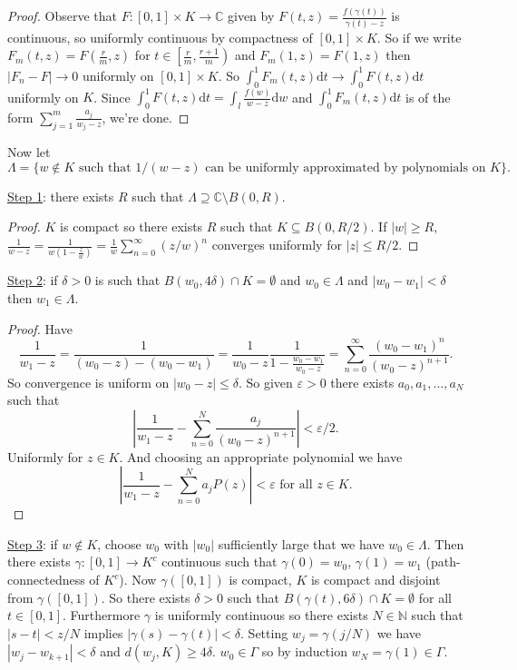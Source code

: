 \documentclass[a4paper, 10pt, twocolumn]{amsart}
\theoremstyle{definition}
\newcommand{\bb}[1]{\mathbb{#1}}
\newcommand{\eps}[0]{\varepsilon}
\newcommand{\sbs}[0]{\subseteq}
\newcommand{\1}{\mathbbm{1}}
\begin{document}
\begin{proof}
    Observe that $F: [0,1]\times K \to \bb{C}$ given by $F(t,z) =\frac{f(\gamma(t))}{\gamma(t)-z}$ is continuous, so uniformly continuous by compactness of $[0,1]\times K$. So if we write $F_m(t,z) = F\left(\frac{r}{m},z\right)$ for $t \in \left[\frac{r}{m},\frac{r+1}{m}\right)$ and $F_m(1,z) = F(1,z)$ then $|F_n-F| \to 0$ uniformly on $[0,1] \times K$. So $\int_0^1 F_m(t,z) \mathrm{d}t \to \int_0^1 F(t,z) \mathrm{d}t$ uniformly on $K$. Since $\int_0^1 F(t,z) \mathrm{d}t = \int_{l} \frac{f(w)}{w-z}\mathrm{d}w$ and $\int_0^1 F_m(t,z)\mathrm{d}t$ is of the form $\sum_{j=1}^m \frac{a_j}{w_j-z}$, we're done.
\end{proof}




Now let \[\Lambda = \{w\not \in K \text{ such that } 1/(w-z) \text{ can be uniformly approximated by polynomials on }K\}.\]

\underline{Step 1}: there exists $R$ such that $\Lambda \supseteq \bb{C}\setminus B(0,R)$. 

\begin{proof}
    $K$ is compact so there exists $R$ such that $K \sbs B(0,R/2)$. If $|w|\ge R$, $\frac{1}{w-z} = \frac{1}{w(1-\frac{z}{w})} = \frac{1}{w} \sum_{n=0}^\infty (z/w)^n$ converges uniformly for $|z|\le R/2$.
\end{proof}

\underline{Step 2}: if $\delta>0$ is such that $B(w_0,4\delta) \cap K = \emptyset$ and $w_0 \in\Lambda$ and $|w_0-w_1|<\delta$ then $w_1 \in \Lambda$. 

\begin{proof}
    Have \[\frac{1}{w_1-z} = \frac{1}{(w_0-z)-(w_0-w_1)} = \frac{1}{w_0-z} \frac{1}{1-\frac{w_0-w_1}{w_0-z}} = \sum_{n=0}^\infty \frac{(w_0-w_1)^n}{(w_0-z)^{n+1}}.\]
    So convergence is uniform on $|w_0-z| \le \delta$. So given $\eps>0$ there exists $a_0,a_1,\ldots,a_N$ such that \[\left|\frac{1}{w_1-z}-\sum_{n=0}^N \frac{a_j}{(w_0-z)^{n+1}} \right| < \eps/2.\]
    Uniformly for $z \in K$. And choosing an appropriate polynomial we have \[\left|\frac{1}{w_1-z} -\sum_{n=0}^N a_jP(z)\right| < \eps\text{ for all } z \in K.\]
\end{proof}

\underline{Step 3}: if $w \not \in K$, choose $w_0$ with $|w_0|$ sufficiently large that we have $w_0 \in \Lambda$. Then there exists $\gamma:[0,1] \to K^c$ continuous such that $\gamma(0) = w_0$, $\gamma(1) =w_1$ (path-connectedness of $K^c$). Now $\gamma([0,1])$ is compact, $K$ is compact and disjoint from $\gamma([0,1])$. So there exists $\delta>0$ such that $B(\gamma(t),6\delta) \cap K = \emptyset$ for all $t \in [0,1]$. Furthermore $\gamma$ is uniformly continuous so there exists $N \in \bb{N}$ such that $|s-t|<z/N$ implies $|\gamma(s)-\gamma(t)|<\delta$. Setting $w_j = \gamma(j/N)$ we have $|w_j-w_{k+1}|<\delta$ and $d(w_j,K) \ge 4\delta$. $w_0 \in \Gamma$ so by induction $w_N = \gamma(1) \in \Gamma$.
\end{document}
